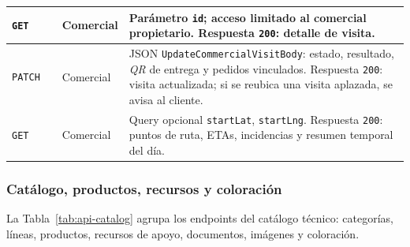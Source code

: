 {\begin{supertabular}{|A{0.10\textwidth}|A{0.27\textwidth}|A{0.15\textwidth}|A{0.38\textwidth}|}
\hline
\texttt{GET} &  & Comercial & Parámetro \texttt{id}; acceso limitado al comercial propietario. Respuesta \texttt{200}: detalle de visita.\\
\hline
\texttt{PATCH} &  & Comercial & JSON \texttt{UpdateCommercialVisitBody}: estado, resultado, \textit{QR} de entrega y pedidos vinculados. Respuesta \texttt{200}: visita actualizada; si se reubica una visita aplazada, se avisa al cliente.\\
\hline
\texttt{GET} &  & Comercial & Query opcional \texttt{startLat}, \texttt{startLng}. Respuesta \texttt{200}: puntos de ruta, ETAs, incidencias y resumen temporal del día.\\
\hline
\end{supertabular}
}

\subsubsection{Catálogo, productos, recursos y coloración}

La Tabla~\ref{tab:api-catalog} agrupa los endpoints del catálogo técnico: categorías, líneas, productos, recursos de apoyo, documentos, imágenes y coloración.


